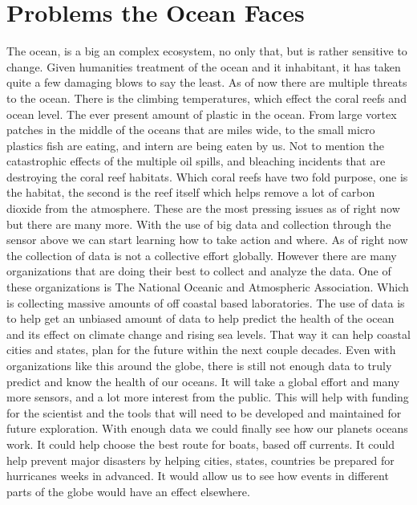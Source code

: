 \documentclass[sigconf]{acmart}
\begin{document}
\section{Problems the Ocean Faces}
The ocean, is a big an complex ecosystem, no only that, but is rather sensitive to change.  Given humanities treatment of the ocean and it inhabitant, it has taken quite a few damaging blows to say the least.  As of now there are multiple threats to the ocean.  There is the climbing temperatures, which effect the coral reefs and ocean level.  The ever present amount of plastic in the ocean.  From large vortex patches in the middle of the oceans that are miles wide, to the small micro plastics fish are eating, and intern are being eaten by us. Not to mention the catastrophic effects of the multiple oil spills, and bleaching incidents that are destroying the coral reef habitats.  Which coral reefs have two fold purpose, one is the habitat, the second is the reef itself which helps remove a lot of carbon dioxide from the atmosphere.  These are the most pressing issues as of right now but there are many more.  With the use of big data and collection through the sensor above we can start learning how to take action and where.
As of right now the collection of data is not a collective effort globally.  However there are many organizations that are doing their best to collect and analyze the data.  One of these organizations is The National Oceanic and Atmospheric Association.  Which is collecting massive amounts of off coastal based laboratories.  The use of data is to help get an unbiased amount of data to help predict the health of the ocean and its effect on climate change and rising sea levels. That way it can help coastal cities and states, plan for the future within the next couple decades.
Even with organizations like this around the globe, there is still not enough data to truly predict and know the health of our oceans.  It will take a global effort and many more sensors, and a lot more interest from the public.  This will help with funding for the scientist and the tools that will need to be developed and maintained for future exploration.
With enough data we could finally see how our planets oceans work.  It could help choose the best route for boats, based off currents.  It could help prevent major disasters by helping cities, states, countries be prepared for hurricanes weeks in advanced.  It would allow us to see how events in different parts of the globe would have an effect elsewhere.
\end{document}
